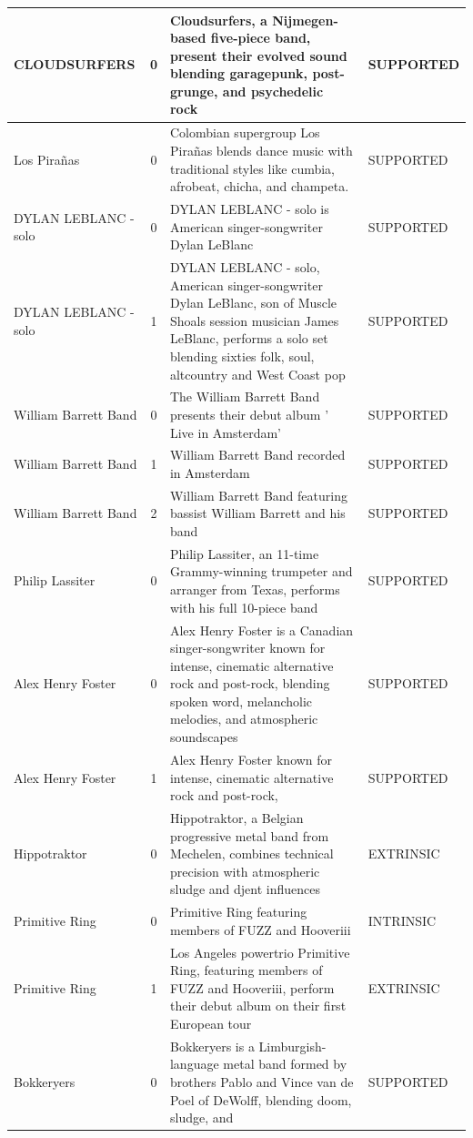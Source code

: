\begin{center}
\begin{longtable}{p{3cm}cp{7cm}p{3cm}}
\midrule
CLOUDSURFERS & 0 & Cloudsurfers, a Nijmegen-based five-piece band, present their evolved sound blending garagepunk, post-grunge, and psychedelic rock & SUPPORTED \\
\midrule
Los Pirañas & 0 & Colombian supergroup Los Pirañas blends dance music with traditional styles like cumbia, afrobeat, chicha, and champeta. & SUPPORTED \\
\midrule
DYLAN LEBLANC - solo & 0 & DYLAN LEBLANC - solo is American singer-songwriter Dylan LeBlanc & SUPPORTED \\
\midrule
DYLAN LEBLANC - solo & 1 & DYLAN LEBLANC - solo, American singer-songwriter Dylan LeBlanc, son of Muscle Shoals session musician James LeBlanc, performs a solo set blending sixties folk, soul, altcountry and West Coast pop & SUPPORTED \\
\midrule
William Barrett Band & 0 & The William Barrett Band presents their debut album ' Live in Amsterdam' & SUPPORTED \\
\midrule
William Barrett Band & 1 & William Barrett Band recorded in Amsterdam & SUPPORTED \\
\midrule
William Barrett Band & 2 & William Barrett Band featuring bassist William Barrett and his band & SUPPORTED \\
\midrule
Philip Lassiter & 0 & Philip Lassiter, an 11-time Grammy-winning trumpeter and arranger from Texas, performs with his full 10-piece band & SUPPORTED \\
\midrule
Alex Henry Foster & 0 & Alex Henry Foster is a Canadian singer-songwriter known for intense, cinematic alternative rock and post-rock, blending spoken word, melancholic melodies, and atmospheric soundscapes & SUPPORTED \\
\midrule
Alex Henry Foster & 1 & Alex Henry Foster known for intense, cinematic alternative rock and post-rock, & SUPPORTED \\
\midrule
Hippotraktor & 0 & Hippotraktor, a Belgian progressive metal band from Mechelen, combines technical precision with atmospheric sludge and djent influences & EXTRINSIC \\
\midrule
Primitive Ring & 0 & Primitive Ring featuring members of FUZZ and Hooveriii & INTRINSIC \\
\midrule
Primitive Ring & 1 & Los Angeles powertrio Primitive Ring, featuring members of FUZZ and Hooveriii, perform their debut album on their first European tour & EXTRINSIC \\
\midrule
Bokkeryers & 0 & Bokkeryers is a Limburgish-language metal band formed by brothers Pablo and Vince van de Poel of DeWolff, blending doom, sludge, and & SUPPORTED \\

\end{longtable}
\end{center}

